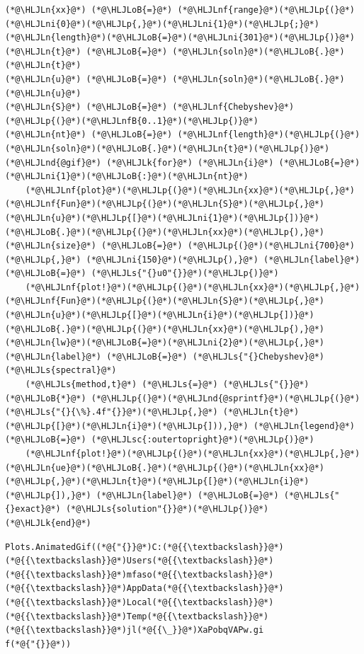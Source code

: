 \documentclass[12pt,a4paper]{article}
\newcommand{\HLJLk}[1]{\textcolor[RGB]{148,91,176}{\textbf{#1}}}
\newcommand{\HLJLn}[1]{#1}
\newcommand{\HLJLnd}[1]{\textcolor[RGB]{214,102,97}{#1}}
\newcommand{\HLJLnf}[1]{\textcolor[RGB]{66,102,213}{#1}}
\newcommand{\HLJLs}[1]{\textcolor[RGB]{201,61,57}{#1}}
\newcommand{\HLJLsc}[1]{\textcolor[RGB]{201,61,57}{#1}}
\newcommand{\HLJLnfB}[1]{\textcolor[RGB]{59,151,46}{#1}}
\newcommand{\HLJLni}[1]{\textcolor[RGB]{59,151,46}{#1}}
\newcommand{\HLJLoB}[1]{\textcolor[RGB]{102,102,102}{\textbf{#1}}}
\newcommand{\HLJLp}[1]{#1}
\begin{document}
\begin{lstlisting}
(*@\HLJLn{xx}@*) (*@\HLJLoB{=}@*) (*@\HLJLnf{range}@*)(*@\HLJLp{(}@*)(*@\HLJLni{0}@*)(*@\HLJLp{,}@*)(*@\HLJLni{1}@*)(*@\HLJLp{;}@*)(*@\HLJLn{length}@*)(*@\HLJLoB{=}@*)(*@\HLJLni{301}@*)(*@\HLJLp{)}@*)
(*@\HLJLn{t}@*) (*@\HLJLoB{=}@*) (*@\HLJLn{soln}@*)(*@\HLJLoB{.}@*)(*@\HLJLn{t}@*)
(*@\HLJLn{u}@*) (*@\HLJLoB{=}@*) (*@\HLJLn{soln}@*)(*@\HLJLoB{.}@*)(*@\HLJLn{u}@*)
(*@\HLJLn{S}@*) (*@\HLJLoB{=}@*) (*@\HLJLnf{Chebyshev}@*)(*@\HLJLp{(}@*)(*@\HLJLnfB{0..1}@*)(*@\HLJLp{)}@*)
(*@\HLJLn{nt}@*) (*@\HLJLoB{=}@*) (*@\HLJLnf{length}@*)(*@\HLJLp{(}@*)(*@\HLJLn{soln}@*)(*@\HLJLoB{.}@*)(*@\HLJLn{t}@*)(*@\HLJLp{)}@*)
(*@\HLJLnd{@gif}@*) (*@\HLJLk{for}@*) (*@\HLJLn{i}@*) (*@\HLJLoB{=}@*) (*@\HLJLni{1}@*)(*@\HLJLoB{:}@*)(*@\HLJLn{nt}@*)
    (*@\HLJLnf{plot}@*)(*@\HLJLp{(}@*)(*@\HLJLn{xx}@*)(*@\HLJLp{,}@*) (*@\HLJLnf{Fun}@*)(*@\HLJLp{(}@*)(*@\HLJLn{S}@*)(*@\HLJLp{,}@*)(*@\HLJLn{u}@*)(*@\HLJLp{[}@*)(*@\HLJLni{1}@*)(*@\HLJLp{])}@*)(*@\HLJLoB{.}@*)(*@\HLJLp{(}@*)(*@\HLJLn{xx}@*)(*@\HLJLp{),}@*) (*@\HLJLn{size}@*) (*@\HLJLoB{=}@*) (*@\HLJLp{(}@*)(*@\HLJLni{700}@*)(*@\HLJLp{,}@*) (*@\HLJLni{150}@*)(*@\HLJLp{),}@*) (*@\HLJLn{label}@*) (*@\HLJLoB{=}@*) (*@\HLJLs{"{}u0"{}}@*)(*@\HLJLp{)}@*)
    (*@\HLJLnf{plot!}@*)(*@\HLJLp{(}@*)(*@\HLJLn{xx}@*)(*@\HLJLp{,}@*) (*@\HLJLnf{Fun}@*)(*@\HLJLp{(}@*)(*@\HLJLn{S}@*)(*@\HLJLp{,}@*)(*@\HLJLn{u}@*)(*@\HLJLp{[}@*)(*@\HLJLn{i}@*)(*@\HLJLp{])}@*)(*@\HLJLoB{.}@*)(*@\HLJLp{(}@*)(*@\HLJLn{xx}@*)(*@\HLJLp{),}@*) (*@\HLJLn{lw}@*)(*@\HLJLoB{=}@*)(*@\HLJLni{2}@*)(*@\HLJLp{,}@*) (*@\HLJLn{label}@*) (*@\HLJLoB{=}@*) (*@\HLJLs{"{}Chebyshev}@*) (*@\HLJLs{spectral}@*) 
    (*@\HLJLs{method,t}@*) (*@\HLJLs{=}@*) (*@\HLJLs{"{}}@*) (*@\HLJLoB{*}@*) (*@\HLJLp{(}@*)(*@\HLJLnd{@sprintf}@*)(*@\HLJLp{(}@*)(*@\HLJLs{"{}{\%}.4f"{}}@*)(*@\HLJLp{,}@*) (*@\HLJLn{t}@*)(*@\HLJLp{[}@*)(*@\HLJLn{i}@*)(*@\HLJLp{])),}@*) (*@\HLJLn{legend}@*) (*@\HLJLoB{=}@*) (*@\HLJLsc{:outertopright}@*)(*@\HLJLp{)}@*)
    (*@\HLJLnf{plot!}@*)(*@\HLJLp{(}@*)(*@\HLJLn{xx}@*)(*@\HLJLp{,}@*) (*@\HLJLn{ue}@*)(*@\HLJLoB{.}@*)(*@\HLJLp{(}@*)(*@\HLJLn{xx}@*)(*@\HLJLp{,}@*)(*@\HLJLn{t}@*)(*@\HLJLp{[}@*)(*@\HLJLn{i}@*)(*@\HLJLp{]),}@*) (*@\HLJLn{label}@*) (*@\HLJLoB{=}@*) (*@\HLJLs{"{}exact}@*) (*@\HLJLs{solution"{}}@*)(*@\HLJLp{)}@*)
(*@\HLJLk{end}@*)
\end{lstlisting}

\begin{lstlisting}
Plots.AnimatedGif((*@{"{}}@*)C:(*@{{\textbackslash}}@*)(*@{{\textbackslash}}@*)Users(*@{{\textbackslash}}@*)(*@{{\textbackslash}}@*)mfaso(*@{{\textbackslash}}@*)(*@{{\textbackslash}}@*)AppData(*@{{\textbackslash}}@*)(*@{{\textbackslash}}@*)Local(*@{{\textbackslash}}@*)(*@{{\textbackslash}}@*)Temp(*@{{\textbackslash}}@*)(*@{{\textbackslash}}@*)jl(*@{{\_}}@*)XaPobqVAPw.gi
f(*@{"{}}@*))
\end{lstlisting}
\end{document}
